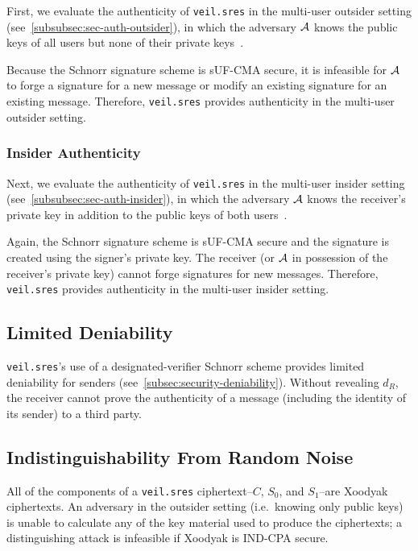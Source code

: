First, we evaluate the authenticity of \texttt{veil.sres} in the multi-user outsider setting
(see~\ref{subsubsec:sec-auth-outsider}), in which the adversary $\mathcal{A}$ knows the public keys of all users but none
of their private keys~\cite[p. 47]{baek2010}.

Because the Schnorr signature scheme is sUF-CMA secure, it is infeasible for $\mathcal{A}$ to forge a signature for a new
message or modify an existing signature for an existing message.
Therefore, \texttt{veil.sres} provides authenticity in the multi-user outsider setting.

\subsubsection{Insider Authenticity}

Next, we evaluate the authenticity of \texttt{veil.sres} in the multi-user insider setting
(see~\ref{subsubsec:sec-auth-insider}), in which the adversary $\mathcal{A}$ knows the receiver's private key in addition
to the public keys of both users~\cite[p. 48]{baek2010}.

Again, the Schnorr signature scheme is sUF-CMA secure and the signature is created using the signer's private key.
The receiver (or $\mathcal{A}$ in possession of the receiver's private key) cannot forge signatures for new messages.
Therefore, \texttt{veil.sres} provides authenticity in the multi-user insider setting.

\subsection{Limited Deniability}\label{subsec:veil.sres-deniability}

\texttt{veil.sres}'s use of a designated-verifier Schnorr scheme provides limited deniability for senders
(see~\ref{subsec:security-deniability}).
Without revealing $d_R$, the receiver cannot prove the authenticity of a message (including the identity of its sender)
to a third party.

\subsection{Indistinguishability From Random Noise}\label{subsec:veil.sres-indistinguishability}

All of the components of a \texttt{veil.sres} ciphertext--$C$, $S_0$, and $S_1$--are Xoodyak ciphertexts.
An adversary in the outsider setting (i.e.\ knowing only public keys) is unable to calculate any of the key material
used to produce the ciphertexts;
a distinguishing attack is infeasible if Xoodyak is IND-CPA secure.

